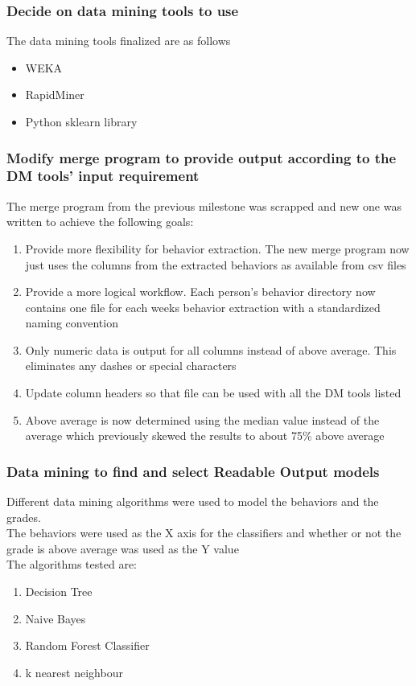 \documentclass[12pt]{article}
\begin{document}
	\subsubsection{Decide on data mining tools to use }
		The data mining tools finalized are as follows
		\begin{itemize}
			\item WEKA
			\item RapidMiner
			\item Python sklearn library
		\end{itemize}
	\subsubsection{Modify merge program to provide output according to the DM tools' input requirement}
	The merge program from the previous milestone was scrapped and new one was written to achieve the following goals:
	\begin{enumerate}
		\item Provide more flexibility for behavior extraction. The new merge program now just uses the columns from the extracted behaviors as available from csv files
		\item Provide a more logical workflow. Each person's behavior directory now contains one file for each weeks behavior extraction with a standardized naming convention
		\item Only numeric data is output for all columns instead of above average. This eliminates any dashes or special characters
		\item Update column headers so that file can be used with all the DM tools listed
		\item Above average is now determined using the median value instead of the average which previously skewed the results to about 75\% above average
	\end{enumerate}
	
	\subsubsection{Data mining to find and select Readable Output models}
	Different data mining algorithms were used to model the behaviors and the grades. \\
	The behaviors were used as the X axis for the classifiers and whether or not the grade is above average was used as the Y value \\
	The algorithms tested are:
	\begin{enumerate}
		\item Decision Tree
		\item Naive Bayes
		\item Random Forest Classifier
		\item k nearest neighbour
	\end{enumerate}
	
\end{document}
